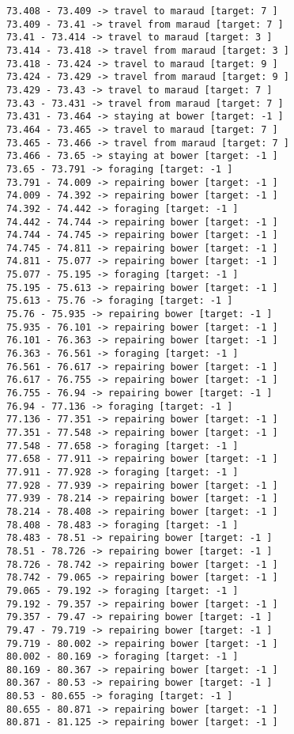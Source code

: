 \documentclass[11pt]{article}
\begin{document}
\begin{Verbatim}[commandchars=\\\{\}]
73.408 - 73.409 -> travel to maraud [target: 7 ]
73.409 - 73.41 -> travel from maraud [target: 7 ]
73.41 - 73.414 -> travel to maraud [target: 3 ]
73.414 - 73.418 -> travel from maraud [target: 3 ]
73.418 - 73.424 -> travel to maraud [target: 9 ]
73.424 - 73.429 -> travel from maraud [target: 9 ]
73.429 - 73.43 -> travel to maraud [target: 7 ]
73.43 - 73.431 -> travel from maraud [target: 7 ]
73.431 - 73.464 -> staying at bower [target: -1 ]
73.464 - 73.465 -> travel to maraud [target: 7 ]
73.465 - 73.466 -> travel from maraud [target: 7 ]
73.466 - 73.65 -> staying at bower [target: -1 ]
73.65 - 73.791 -> foraging [target: -1 ]
73.791 - 74.009 -> repairing bower [target: -1 ]
74.009 - 74.392 -> repairing bower [target: -1 ]
74.392 - 74.442 -> foraging [target: -1 ]
74.442 - 74.744 -> repairing bower [target: -1 ]
74.744 - 74.745 -> repairing bower [target: -1 ]
74.745 - 74.811 -> repairing bower [target: -1 ]
74.811 - 75.077 -> repairing bower [target: -1 ]
75.077 - 75.195 -> foraging [target: -1 ]
75.195 - 75.613 -> repairing bower [target: -1 ]
75.613 - 75.76 -> foraging [target: -1 ]
75.76 - 75.935 -> repairing bower [target: -1 ]
75.935 - 76.101 -> repairing bower [target: -1 ]
76.101 - 76.363 -> repairing bower [target: -1 ]
76.363 - 76.561 -> foraging [target: -1 ]
76.561 - 76.617 -> repairing bower [target: -1 ]
76.617 - 76.755 -> repairing bower [target: -1 ]
76.755 - 76.94 -> repairing bower [target: -1 ]
76.94 - 77.136 -> foraging [target: -1 ]
77.136 - 77.351 -> repairing bower [target: -1 ]
77.351 - 77.548 -> repairing bower [target: -1 ]
77.548 - 77.658 -> foraging [target: -1 ]
77.658 - 77.911 -> repairing bower [target: -1 ]
77.911 - 77.928 -> foraging [target: -1 ]
77.928 - 77.939 -> repairing bower [target: -1 ]
77.939 - 78.214 -> repairing bower [target: -1 ]
78.214 - 78.408 -> repairing bower [target: -1 ]
78.408 - 78.483 -> foraging [target: -1 ]
78.483 - 78.51 -> repairing bower [target: -1 ]
78.51 - 78.726 -> repairing bower [target: -1 ]
78.726 - 78.742 -> repairing bower [target: -1 ]
78.742 - 79.065 -> repairing bower [target: -1 ]
79.065 - 79.192 -> foraging [target: -1 ]
79.192 - 79.357 -> repairing bower [target: -1 ]
79.357 - 79.47 -> repairing bower [target: -1 ]
79.47 - 79.719 -> repairing bower [target: -1 ]
79.719 - 80.002 -> repairing bower [target: -1 ]
80.002 - 80.169 -> foraging [target: -1 ]
80.169 - 80.367 -> repairing bower [target: -1 ]
80.367 - 80.53 -> repairing bower [target: -1 ]
80.53 - 80.655 -> foraging [target: -1 ]
80.655 - 80.871 -> repairing bower [target: -1 ]
80.871 - 81.125 -> repairing bower [target: -1 ]

\end{Verbatim}
\end{document}
